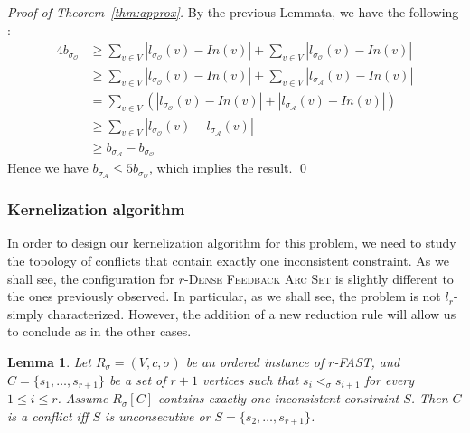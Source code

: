 \documentclass[11pt]{article}
\newtheorem{lemma}[theorem]{Lemma}
\newcommand{\FASHT}{\textsc{$r$-Dense Feedback Arc Set}}
\begin{document}
\emph{Proof of Theorem~\ref{thm:approx}.} By the previous Lemmata, we have the following :
			$$
				\begin{array}{ll}
				\displaystyle 4b_{\sigma_\mathcal{O}} & \geqslant \sum_{v \in V} | l_{\sigma_\mathcal{O}}(v) - In(v) | + \sum_{v \in V} | l_{\sigma_\mathcal{O}}(v) - In(v) | \\
													& \geqslant \sum_{v \in V} | l_{\sigma_\mathcal{O}}(v) - In(v) | + \sum_{v \in V} | l_{\sigma_\mathcal{A}}(v) - In(v) | \\
													&  =  \sum_{v \in V} (| l_{\sigma_\mathcal{O}}(v) - In(v) | + | l_{\sigma_\mathcal{A}}(v) - In(v) |) \\
													& \geqslant \sum_{v \in V} | l_{\sigma_\mathcal{O}}(v) - l_{\sigma_\mathcal{A}}(v) | \\
													& \geqslant b_{\sigma_\mathcal{A}} - b_{\sigma_\mathcal{O}}
			\end{array}
			$$
			Hence we have $b_{\sigma_\mathcal{A}} \leqslant 5b_{\sigma_\mathcal{O}}$, which implies the result. 
\hfill \qed


 
\subsubsection{Kernelization algorithm}

In order to design our kernelization algorithm for this problem, we need to study the topology of conflicts that contain exactly one inconsistent constraint. As we shall see, the configuration for \FASHT{} is slightly different to the ones previously observed. In particular, as we shall see, the problem is not $l_r$-simply characterized. However, the addition of a new reduction rule will allow us to conclude as in the other cases.  

\begin{lemma}
\label{lem:fashtconflict}
	Let $R_\sigma = (V, c, \sigma)$ be an ordered instance of {\sc $r$-FAST}, and $C = \{s_1, \ldots, s_{r+1}\}$ be a set of $r + 1$ vertices such that $s_i <_\sigma s_{i+1}$ for every $1 \leqslant i \leqslant r$. Assume $R_\sigma[C]$ contains exactly one inconsistent constraint $S$. Then $C$ is a conflict iff $S$ is unconsecutive or $S = \{s_2, \ldots, s_{r+1}\}$.
\end{lemma}
\end{document}
